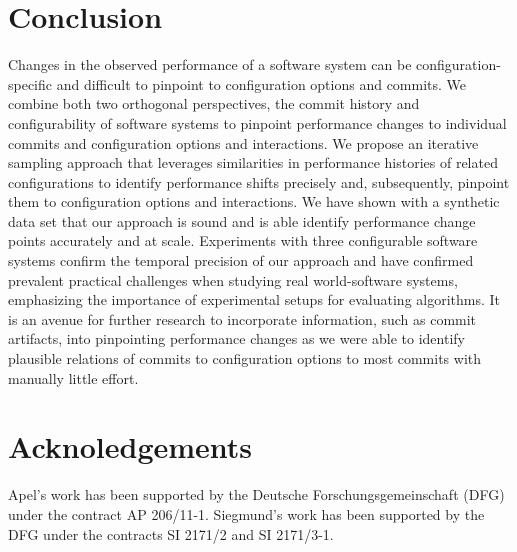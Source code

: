 \documentclass[sigconf]{acmart}
\begin{document}
	\section{Conclusion}
	Changes in the observed performance of a software system can be configuration-specific and difficult to pinpoint to configuration options and commits. We combine both two orthogonal perspectives, the commit history and configurability of software systems to pinpoint performance changes to individual commits and configuration options and interactions. 
	We propose an iterative sampling approach that leverages similarities in performance histories of related configurations to identify performance shifts precisely and, subsequently, pinpoint them to configuration options and interactions. 
	We have shown with a synthetic data set that our approach is sound and is able identify performance change points accurately and at scale. Experiments with three configurable software systems confirm the temporal precision of our approach and have confirmed prevalent practical challenges when studying real world-software systems, emphasizing the importance of experimental setups for evaluating algorithms. It is an avenue for further research to incorporate information, such as commit artifacts, into pinpointing performance changes as we were able to identify plausible relations of commits to configuration options to most commits with manually little effort.
	
	\section{Acknoledgements}
	Apel’s work has been supported by the Deutsche Forschungsgemeinschaft (DFG) under the contract AP 206/11-1. Siegmund’s work has been supported by the DFG under the
	contracts SI 2171/2 and SI 2171/3-1.
	
	\clearpage
	
	
	
	\clearpage
	
	
\end{document}
